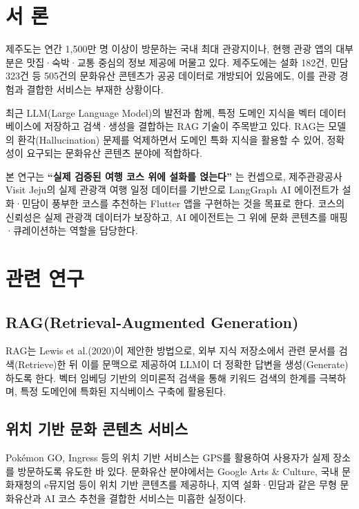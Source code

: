 \documentclass[10pt,twocolumn,a4paper]{article}
\begin{document}
\section{서 론}

제주도는 연간 1,500만 명 이상이 방문하는 국내 최대 관광지이나, 현행 관광
앱의 대부분은 맛집·숙박·교통 중심의 정보 제공에 머물고 있다. 제주도에는
설화 182건, 민담 323건 등 505건의 문화유산 콘텐츠가 공공 데이터로 개방되어
있음에도, 이를 관광 경험과 결합한 서비스는 부재한 상황이다.

최근 LLM(Large Language Model)의 발전과 함께, 특정 도메인 지식을 벡터
데이터베이스에 저장하고 검색·생성을 결합하는 RAG 기술이 주목받고 있다.
RAG는 모델의 환각(Hallucination) 문제를 억제하면서 도메인 특화 지식을
활용할 수 있어, 정확성이 요구되는 문화유산 콘텐츠 분야에 적합하다.

본 연구는 \textbf{``실제 검증된 여행 코스 위에 설화를 얹는다''} 는 컨셉으로,
제주관광공사 Visit Jeju의 실제 관광객 여행 일정 데이터를 기반으로 LangGraph
AI 에이전트가 설화·민담이 풍부한 코스를 추천하는 Flutter 앱을 구현하는 것을
목표로 한다. 코스의 신뢰성은 실제 관광객 데이터가 보장하고, AI 에이전트는
그 위에 문화 콘텐츠를 매핑·큐레이션하는 역할을 담당한다.

\section{관련 연구}

\subsection{RAG(Retrieval-Augmented Generation)}

RAG는 Lewis et al.(2020)이 제안한 방법으로, 외부 지식 저장소에서 관련
문서를 검색(Retrieve)한 뒤 이를 문맥으로 제공하여 LLM이 더 정확한 답변을
생성(Generate)하도록 한다. 벡터 임베딩 기반의 의미론적 검색을 통해 키워드
검색의 한계를 극복하며, 특정 도메인에 특화된 지식베이스 구축에 활용된다.

\subsection{위치 기반 문화 콘텐츠 서비스}

Pok\'{e}mon GO, Ingress 등의 위치 기반 서비스는 GPS를 활용하여 사용자가
실제 장소를 방문하도록 유도한 바 있다. 문화유산 분야에서는 Google Arts \&
Culture, 국내 문화재청의 e뮤지엄 등이 위치 기반 콘텐츠를 제공하나, 지역
설화·민담과 같은 무형 문화유산과 AI 코스 추천을 결합한 서비스는 미흡한
실정이다.
\end{document}
